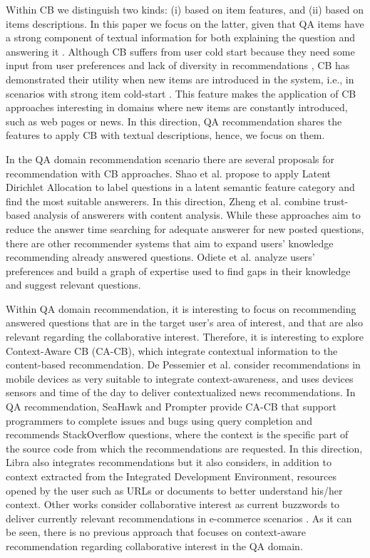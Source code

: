 \documentclass[preprint]{elsarticle}
\begin{document}
\begin{spacing}{1.5}
Within CB we distinguish two kinds: (i) based on item features, and (ii) based on items descriptions. In this paper we focus on the latter, given that QA items have a strong component of textual information for both explaining the question and answering it \cite{Figueroa2016}. Although CB suffers from user cold start because they need some input from user preferences and lack of diversity in recommendations \cite{Barragans2010}, CB has demonstrated their utility when new items are introduced in the system, i.e., in scenarios with strong item cold-start \cite{Aggarwal2016}. This feature makes the application of CB approaches interesting in domains where new items are constantly introduced, such as web pages or news. In this direction, QA recommendation shares the features to apply CB with textual descriptions, hence, we focus on them.

In the QA domain recommendation scenario there are several proposals for recommendation with CB approaches. Shao et al.\cite{Shao2017} propose to apply Latent Dirichlet Allocation to label questions in a latent semantic feature category and find the most suitable answerers. In this direction, Zheng et al. \cite{Zheng2015b} combine trust-based analysis of answerers with content analysis. While these approaches aim to reduce the answer time searching for adequate answerer for new posted questions, there are other recommender systems that aim to expand users' knowledge recommending already answered questions. Odiete et al. \cite{Odiete2017} analyze users' preferences and build a graph of expertise used to find gaps in their knowledge and suggest relevant questions.

Within QA domain recommendation, it is interesting to focus on recommending answered questions that are in the target user's area of interest, and that are also relevant regarding the collaborative interest. Therefore, it is interesting to explore Context-Aware CB (CA-CB), which integrate contextual information to the content-based recommendation. De Pessemier et al. \cite{DePessemier2016} consider recommendations in mobile devices as very suitable to integrate context-awareness, and uses devices sensors and time of the day to deliver contextualized news recommendations. In QA recommendation, SeaHawk \cite{Ponzanelli2014} and Prompter \cite{Ponzanelli2014b} provide CA-CB that support programmers to complete issues and bugs using query completion and recommends StackOverflow questions, where the context is the specific part of the source code from which the recommendations are requested. In this direction, Libra \cite{Ponzanelli2017} also integrates recommendations but it also considers, in addition to context extracted from the Integrated Development Environment, resources opened by the user such as URLs or documents to better understand his/her context. Other works consider collaborative interest as current buzzwords to deliver currently relevant recommendations in e-commerce scenarios \cite{Parikh2009}. As it can be seen, there is no previous approach that focuses on context-aware recommendation regarding collaborative interest in the QA domain.


\end{spacing}
\end{document}
